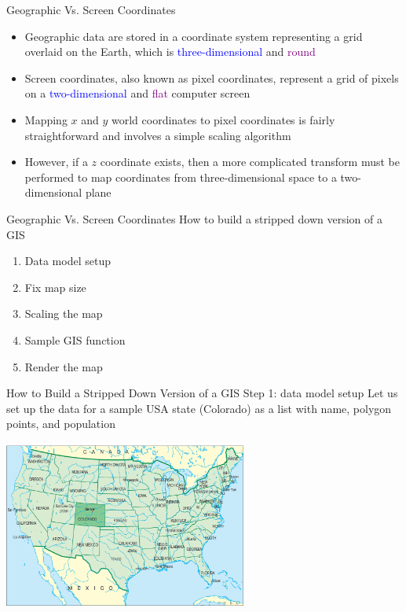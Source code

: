 \documentclass[show notes, aspectratio=1610]{beamer}
\begin{document}
\begin{frame}{Geographic Vs. Screen Coordinates}{}
	\begin{itemize}
		\item Geographic data are stored in a coordinate system representing a
		      grid overlaid on the Earth, which is \textcolor{blue}{three-dimensional}
		      and \textcolor{purple}{round}
		      \pause
		\item Screen coordinates, also known as pixel coordinates, represent a
		      grid of pixels on a \textcolor{blue}{two-dimensional} and \textcolor{purple}
		      {flat} computer screen
		      \pause
		\item Mapping $x$ and $y$ world coordinates to pixel coordinates is fairly
		      straightforward and involves a simple scaling algorithm
		      \pause
		\item However, if a $z$ coordinate exists, then a more complicated
		      transform must be performed to map coordinates from three-dimensional
		      space to a two-dimensional plane
	\end{itemize}
\end{frame}

\begin{frame}{Geographic Vs. Screen Coordinates}
	{How to build a stripped down version of a GIS}
	\begin{enumerate}
		\item Data model setup
		\item Fix map size
		\item Scaling the map
		\item Sample GIS function
		\item Render the map
	\end{enumerate}
\end{frame}

\begin{frame}{How to Build a Stripped Down Version of a GIS}
	{Step 1: data model setup}
	Let us set up the data for a sample USA state (Colorado) as a
	list with name, polygon points, and population

	\centering

	\includegraphics[width=0.6\textwidth]{images/colorado}
\end{frame}
\end{document}
